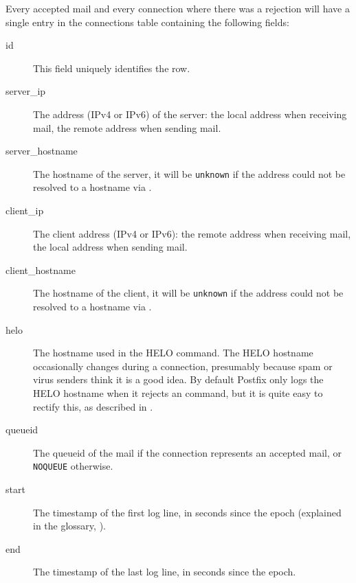 \label{connections table}

Every accepted mail and every connection where there was a rejection will
have a single entry in the connections table containing the following
fields:

\begin{description}

    \item [id] This field uniquely identifies the row.

    \item [server\_ip] The \IP{} address (IPv4 or IPv6) of the server: the
        local address when receiving mail, the remote address when sending
        mail.

    \item [server\_hostname] The hostname of the server, it will be
        \texttt{unknown} if the \IP{} address could not be resolved to a
        hostname via \DNS{}\@.

    \item [client\_ip] The client \IP{} address (IPv4 or IPv6): the remote
        address when receiving mail, the local address when sending mail.

    \item [client\_hostname] The hostname of the client, it will be
        \texttt{unknown} if the \IP{} address could not be resolved to a
        hostname via \DNS{}\@.

    \item [helo] The hostname used in the HELO command.  The HELO hostname
        occasionally changes during a connection, presumably because spam
        or virus senders think it is a good idea.  By default Postfix only
        logs the HELO hostname when it rejects an \SMTP{} command, but it
        is quite easy to rectify this, as described in .

    \item [queueid] The queueid of the mail if the connection represents an
        accepted mail, or \texttt{NOQUEUE} otherwise.

    \item [start] The timestamp of the first log line, in seconds since the
        epoch (explained in the glossary, ).

    \item [end] The timestamp of the last log line, in seconds since the
        epoch.

\end{description}

